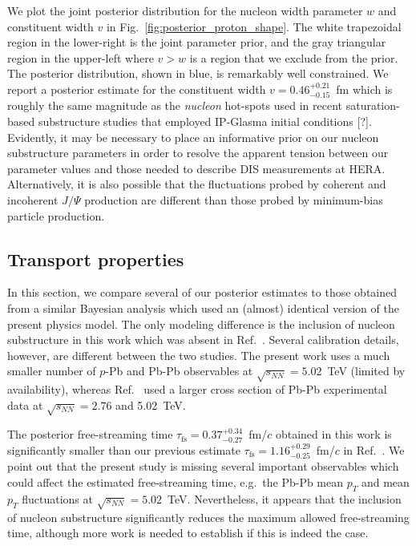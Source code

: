 \documentclass[aps,prc,reprint,amsmath,nofootinbib]{revtex4-1}
\newcommand{\sqrts}{\sqrt{s_{NN}}}
\newcommand{\taufs}{\tau_\mathrm{fs}}
\newcommand{\note}{\textcolor{theblue}{[?]}}
\begin{document}
We plot the joint posterior distribution for the nucleon width parameter $w$ and constituent width $v$ in Fig.~\ref{fig:posterior_proton_shape}.
The white trapezoidal region in the lower-right is the joint parameter prior, and the gray triangular region in the upper-left where $v > w$ is a region that we exclude from the prior.
The posterior distribution, shown in blue, is remarkably well constrained.
We report a posterior estimate for the constituent width $v=0.46_{-0.15}^{+0.21}$~fm which is roughly the same magnitude as the \emph{nucleon} hot-spots used in recent saturation-based substructure studies that employed IP-Glasma initial conditions \note.
Evidently, it may be necessary to place an informative prior on our nucleon substructure parameters in order to resolve the apparent tension between our parameter values and those needed to describe DIS measurements at HERA.
Alternatively, it is also possible that the fluctuations probed by coherent and incoherent $J/\Psi$ production are different than those probed by minimum-bias particle production.

\subsection{Transport properties}

In this section, we compare several of our posterior estimates to those obtained from a similar Bayesian analysis \cite{Bernhard:2018hnz} which used an (almost) identical version of the present physics model.
The only modeling difference is the inclusion of nucleon substructure in this work which was absent in Ref.~\cite{Bernhard:2018hnz}.
Several calibration details, however, are different between the two studies.
The present work uses a much smaller number of $p$-Pb and Pb-Pb observables at $\sqrts=5.02$~TeV (limited by availability), whereas Ref.~\cite{Bernhard:2018hnz} used a larger cross section of Pb-Pb experimental data at $\sqrts=2.76$ and 5.02~TeV.

The posterior free-streaming time $\taufs=0.37_{-0.27}^{+0.34}$~fm/$c$ obtained in this work is significantly smaller than our previous estimate $\taufs=1.16_{-0.25}^{+0.29}$~fm/$c$ in Ref.~\cite{Bernhard:2018hnz}.
We point out that the present study is missing several important observables which could affect the estimated free-streaming time, e.g.\ the Pb-Pb mean $p_T$ and mean $p_T$ fluctuations at $\sqrts=5.02$~TeV.
Nevertheless, it appears that the inclusion of nucleon substructure significantly reduces the maximum allowed free-streaming time, although more work is needed to establish if this is indeed the case.
\end{document}
